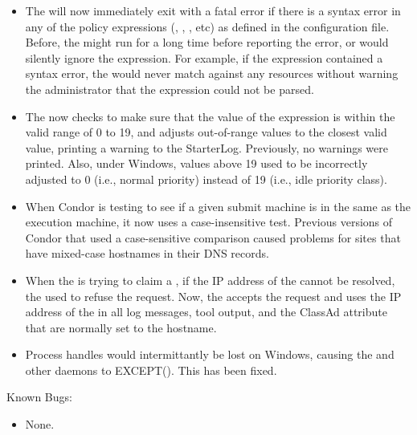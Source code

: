 \begin{itemize}

\item The  will now immediately exit with a fatal error
  if there is a syntax error in any of the policy expressions
  (, , , etc) as
  defined in the configuration file.
  Before, the  might run for a long time before
  reporting the error, or would silently ignore the expression.
  For example, if the  expression contained a syntax
  error, the  would never match against any resources
  without warning the administrator that the 
  expression could not be parsed.

\item The  now checks to make sure that the value of
      the  expression is within the
      valid range of 0 to 19, and adjusts out-of-range values to the
      closest valid value, printing a warning to the StarterLog.
      Previously, no warnings were printed.  Also, under Windows,
      values above 19 used to be incorrectly adjusted to 0 (i.e.,
      normal priority) instead of 19 (i.e., idle priority class).

\item When Condor is testing to see if a given submit machine is in
  the same  as the execution machine, it now uses 
  a case-insensitive test.
  Previous versions of Condor that used a case-sensitive comparison
  caused problems for sites that have mixed-case hostnames in their
  DNS records.

\item When the  is trying to claim a ,
  if the IP address of the  cannot be resolved, the
   used to refuse the request.
  Now, the  accepts the request and uses the IP address
  of the  in all log messages, tool output, and the
   ClassAd attribute that are normally set to the
  hostname.

\item Process handles would intermittantly be lost on Windows, causing
  the  and other daemons to EXCEPT(). This has been fixed.

\end{itemize}

\noindent Known Bugs:

\begin{itemize}

\item None.

\end{itemize}


